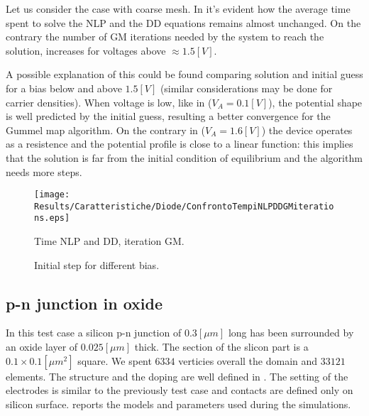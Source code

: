  Let us consider the case with coarse mesh. In  it's evident how the average time spent to solve the NLP and the DD equations remains almost unchanged. On the contrary the number of GM iterations needed by the system to reach the solution, increases for voltages above $\approx 1.5[V]$.

A possible explanation of this could be found comparing solution and initial guess for a bias below and above $1.5[V]$ (similar considerations may be done for carrier densities). When voltage is low, like in  ($V_A = 0.1[V]$), the potential shape is well predicted by the initial guess, resulting a better convergence for the Gummel map algorithm. On the contrary in  ($V_A=1.6[V]$) the device operates as a resistence and the potential profile is close to a linear function: this implies that the solution is far from the initial condition of equilibrium and the algorithm needs more steps.


 
 \begin{figure}[!t]
\centering
\texttt{[image: Results/Caratteristiche/Diode/ConfrontoTempiNLPDDGMiterations.eps]}
\caption{Time NLP and DD, iteration GM.}
\label{fig: tempi computazionali 2}
\end{figure}

\begin{figure}[!b]
\centering
{}
\caption{Initial step for different bias.}
\label{fig: different biast initial step}
\end{figure}
 



\clearpage


\subsection{p-n junction in oxide}
\label{sec: PNOX}

In this test case a silicon p-n junction of $0.3[\mu m]$ long has been surrounded by an oxide layer of $0.025[\mu m]$ thick. The section of the slicon part is a $0.1 \times 0.1 [\mu m^2]$ square.  We spent $6334$ verticies overall the domain and $33121$ elements. The structure and the doping are well defined in . The setting of the electrodes is similar to the previously test case and contacts are defined only on silicon surface. 
 reports the models and parameters used during the simulations.

